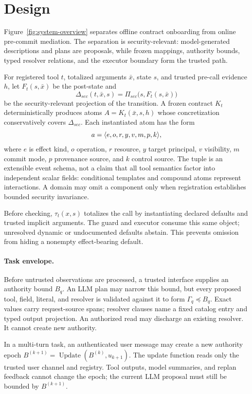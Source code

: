\section{Design}

Figure~\ref{fig:system-overview} separates offline contract onboarding from online pre-commit mediation. The separation is security-relevant: model-generated descriptions and plans are proposals, while frozen mappings, authority bounds, typed resolver relations, and the executor boundary form the trusted path.


For registered tool $t$, totalized arguments $\bar{x}$, state $s$, and trusted pre-call evidence $h$, let $F_t(s,\bar{x})$ be the post-state and
\[
  \Delta_{sec}(t,\bar{x},s)=\Pi_{sec}\bigl(s,F_t(s,\bar{x})\bigr)
\]
be the security-relevant projection of the transition. A frozen contract $K_t$ deterministically produces atoms $A=K_t(\bar{x},s,h)$ whose concretization conservatively covers $\Delta_{sec}$. Each instantiated atom has the form
\[
  a=\langle e,o,r,y,v,m,p,k\rangle,
\]
where $e$ is effect kind, $o$ operation, $r$ resource, $y$ target principal, $v$ visibility, $m$ commit mode, $p$ provenance source, and $k$ control source. The tuple is an extensible event schema, not a claim that all tool semantics factor into independent scalar fields: conditional templates and compound atoms represent interactions. A domain may omit a component only when registration establishes bounded security invariance.

Before checking, $\tau_t(x,s)$ totalizes the call by instantiating declared defaults and trusted implicit arguments. The guard and executor consume this same object; unresolved dynamic or undocumented defaults abstain. This prevents omission from hiding a nonempty effect-bearing default.

\paragraph{Task envelope.}
Before untrusted observations are processed, a trusted interface supplies an authority bound $B_q$. An LLM plan may narrow this bound, but every proposed tool, field, literal, and resolver is validated against it to form $\Gamma_q\preceq B_q$. Exact values carry request-source spans; resolver clauses name a fixed catalog entry and typed output projection. An authorized read may discharge an existing resolver. It cannot create new authority.

In a multi-turn task, an authenticated user message may create a new authority epoch $B^{(k+1)}=\operatorname{Update}(B^{(k)},u_{k+1})$. The update function reads only the trusted user channel and registry. Tool outputs, model summaries, and replan feedback cannot change the epoch; the current LLM proposal must still be bounded by $B^{(k+1)}$.


